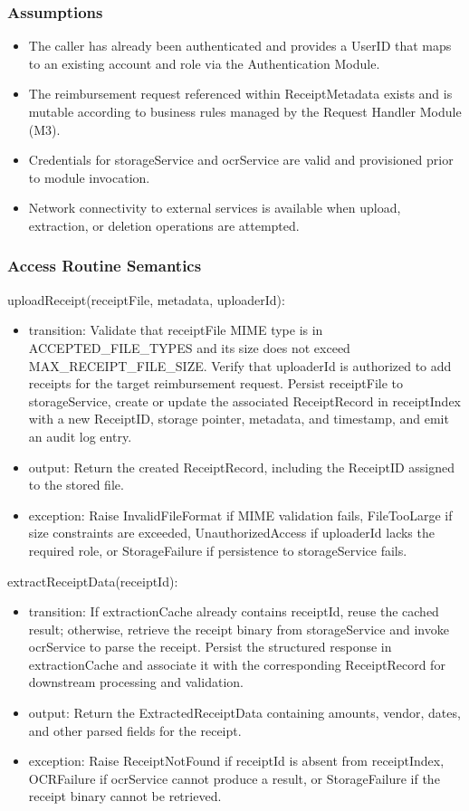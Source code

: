 \documentclass[12pt, titlepage]{article}
\begin{document}
\subsubsection{Assumptions}

\begin{itemize}
  \item The caller has already been authenticated and provides a UserID that maps to an existing account and role via the Authentication Module.
  \item The reimbursement request referenced within ReceiptMetadata exists and is mutable according to business rules managed by the Request Handler Module (M3).
  \item Credentials for storageService and ocrService are valid and provisioned prior to module invocation.
  \item Network connectivity to external services is available when upload, extraction, or deletion operations are attempted.
\end{itemize}

\subsubsection{Access Routine Semantics}

\noindent uploadReceipt(receiptFile, metadata, uploaderId):
\begin{itemize}
  \item transition: Validate that receiptFile MIME type is in ACCEPTED\_FILE\_TYPES and its size does not exceed MAX\_RECEIPT\_FILE\_SIZE. Verify that uploaderId is authorized to add receipts for the target reimbursement request. Persist receiptFile to storageService, create or update the associated ReceiptRecord in receiptIndex with a new ReceiptID, storage pointer, metadata, and timestamp, and emit an audit log entry.
  \item output: Return the created ReceiptRecord, including the ReceiptID assigned to the stored file.
  \item exception: Raise InvalidFileFormat if MIME validation fails, FileTooLarge if size constraints are exceeded, UnauthorizedAccess if uploaderId lacks the required role, or StorageFailure if persistence to storageService fails.
\end{itemize}

\noindent extractReceiptData(receiptId):
\begin{itemize}
  \item transition: If extractionCache already contains receiptId, reuse the cached result; otherwise, retrieve the receipt binary from storageService and invoke ocrService to parse the receipt. Persist the structured response in extractionCache and associate it with the corresponding ReceiptRecord for downstream processing and validation.
  \item output: Return the ExtractedReceiptData containing amounts, vendor, dates, and other parsed fields for the receipt.
  \item exception: Raise ReceiptNotFound if receiptId is absent from receiptIndex, OCRFailure if ocrService cannot produce a result, or StorageFailure if the receipt binary cannot be retrieved.
\end{itemize}
\end{document}
